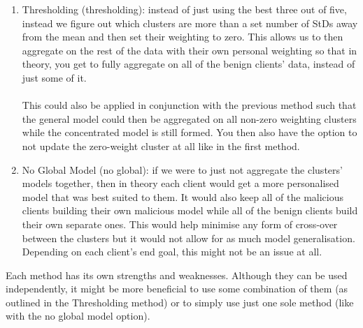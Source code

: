 \begin{enumerate}
    \item Thresholding (thresholding): instead of just using the best three out of five, instead we figure out which clusters are more than a set number of StDs away from the mean and then set their weighting to zero.
    This allows us to then aggregate on the rest of the data with their own personal weighting so that in theory, you get to fully aggregate on all of the benign clients' data, instead of just some of it.
    \\ \\
    This could also be applied in conjunction with the previous method such that the general model could then be aggregated on all non-zero weighting clusters while the concentrated model is still formed.
    You then also have the option to not update the zero-weight cluster at all like in the first method.
    
    \item No Global Model (no global): if we were to just not aggregate the clusters' models together, then in theory each client would get a more personalised model that was best suited to them.
    It would also keep all of the malicious clients building their own malicious model while all of the benign clients build their own separate ones.
    This would help minimise any form of cross-over between the clusters but it would not allow for as much model generalisation.
    Depending on each client's end goal, this might not be an issue at all.
\end{enumerate}

Each method has its own strengths and weaknesses.
Although they can be used independently, it might be more beneficial to use some combination of them (as outlined in the Thresholding method) or to simply use just one sole method (like with the no global model option).


